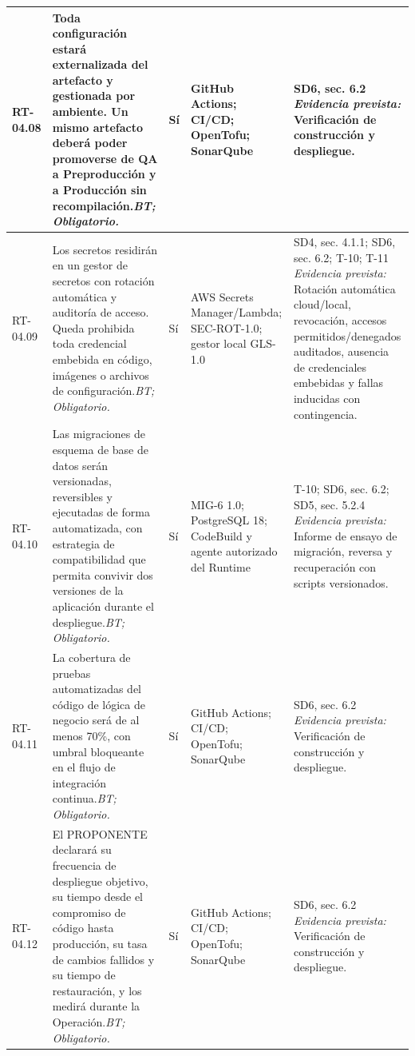 \begin{paginaHorizontalSynaptix}
\begin{longtable}{|L{0.09\AnchoMatrizTDoce}|L{0.385\AnchoMatrizTDoce}|L{0.065\AnchoMatrizTDoce}|L{0.18\AnchoMatrizTDoce}|L{0.28\AnchoMatrizTDoce}|}
RT-\allowbreak{}04.\allowbreak{}08 &
Toda configuración estará externalizada del artefacto y gestionada por ambiente. Un mismo artefacto deberá poder promoverse de QA a Preproducción y a Producción sin recompilación.\newline\textit{BT; Obligatorio.} &
Sí &
GitHub Actions; CI/CD; OpenTofu; SonarQube &
SD6, sec. 6.2 \newline\textit{Evidencia prevista:} Verificación de construcción y despliegue. \\ \hline

RT-\allowbreak{}04.\allowbreak{}09 &
Los secretos residirán en un gestor de secretos con rotación automática y auditoría de acceso. Queda prohibida toda credencial embebida en código, imágenes o archivos de configuración.\newline\textit{BT; Obligatorio.} &
Sí &
AWS Secrets Manager/Lambda; SEC-ROT-1.0; gestor local GLS-1.0 &
SD4, sec. 4.1.1; SD6, sec. 6.2; T-10; T-11 \newline\textit{Evidencia prevista:} Rotación automática cloud/local, revocación, accesos permitidos/denegados auditados, ausencia de credenciales embebidas y fallas inducidas con contingencia. \\ \hline

RT-\allowbreak{}04.\allowbreak{}10 &
Las migraciones de esquema de base de datos serán versionadas, reversibles y ejecutadas de forma automatizada, con estrategia de compatibilidad que permita convivir dos versiones de la aplicación durante el despliegue.\newline\textit{BT; Obligatorio.} &
Sí &
MIG-6 1.0; PostgreSQL 18; CodeBuild y agente autorizado del Runtime &
T-10; SD6, sec. 6.2; SD5, sec. 5.2.4 \newline\textit{Evidencia prevista:} Informe de ensayo de migración, reversa y recuperación con scripts versionados. \\ \hline

RT-\allowbreak{}04.\allowbreak{}11 &
La cobertura de pruebas automatizadas del código de lógica de negocio será de al menos 70\%, con umbral bloqueante en el flujo de integración continua.\newline\textit{BT; Obligatorio.} &
Sí &
GitHub Actions; CI/CD; OpenTofu; SonarQube &
SD6, sec. 6.2 \newline\textit{Evidencia prevista:} Verificación de construcción y despliegue. \\ \hline

RT-\allowbreak{}04.\allowbreak{}12 &
El PROPONENTE declarará su frecuencia de despliegue objetivo, su tiempo desde el compromiso de código hasta producción, su tasa de cambios fallidos y su tiempo de restauración, y los medirá durante la Operación.\newline\textit{BT; Obligatorio.} &
Sí &
GitHub Actions; CI/CD; OpenTofu; SonarQube &
SD6, sec. 6.2 \newline\textit{Evidencia prevista:} Verificación de construcción y despliegue. \\ \hline


\end{longtable}
\end{paginaHorizontalSynaptix}
